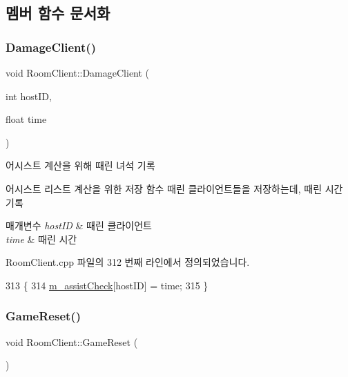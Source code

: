 \subsection{멤버 함수 문서화}
\mbox{\label{class_room_client_a16bae0bd06c33e1f96b5a3ac675db567}} 
\subsubsection{\texorpdfstring{Damage\+Client()}{DamageClient()}}
{\footnotesize\ttfamily void Room\+Client\+::\+Damage\+Client (\begin{DoxyParamCaption}\item[{int}]{host\+ID,  }\item[{float}]{time }\end{DoxyParamCaption})}



어시스트 계산을 위해 때린 녀석 기록 

어시스트 리스트 계산을 위한 저장 함수  때린 클라이언트들을 저장하는데, 때린 시간 기록


\begin{DoxyParams}{매개변수}
{\em host\+ID} & 때린 클라이언트 \\
\hline
{\em time} & 때린 시간 \\
\hline
\end{DoxyParams}


Room\+Client.\+cpp 파일의 312 번째 라인에서 정의되었습니다.


\begin{DoxyCode}
313 \{
314     \hyperlink{class_room_client_a9f63a98f8a902a52bf272f23af3e5f82}{m\_assistCheck}[hostID] = time;
315 \}
\end{DoxyCode}
\mbox{\label{class_room_client_a0ba33e4df82c58b4d7f8278daefc6bd9}} 
\subsubsection{\texorpdfstring{Game\+Reset()}{GameReset()}}
{\footnotesize\ttfamily void Room\+Client\+::\+Game\+Reset (\begin{DoxyParamCaption}{ }\end{DoxyParamCaption})}



